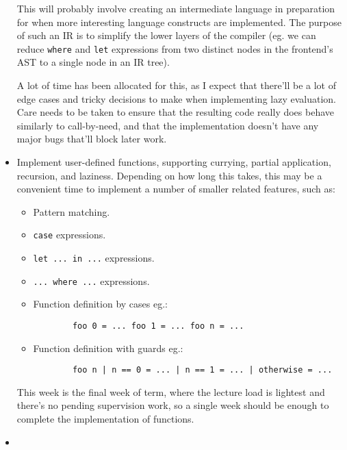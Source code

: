 \documentclass[12pt]{article}
\newcommand\haskell[1]{\texttt{#1}}
\begin{document}
\begin{itemize}
{    This will probably involve creating an intermediate language in preparation for when more interesting language
    constructs are implemented. The purpose of such an IR is to simplify the lower layers of the compiler (eg. we can
    reduce \haskell{where} and \haskell{let} expressions from two distinct nodes in the frontend's AST to a single node
    in an IR tree).

    A lot of time has been allocated for this, as I expect that there'll be a lot of edge cases and tricky decisions to
    make when implementing lazy evaluation. Care needs to be taken to ensure that the resulting code really does behave
    similarly to call-by-need, and that the implementation doesn't have any major bugs that'll block later work.
}
\item
{

    Implement user-defined functions, supporting currying, partial application, recursion, and laziness. Depending on
    how long this takes, this may be a convenient time to implement a number of smaller related features, such as:
    
    \begin{itemize}
    \item Pattern matching.
    \item \haskell{case} expressions.
    \item \haskell{let ... in ...} expressions.
    \item \haskell{... where ...} expressions.
    \item
    {

        Function definition by cases eg.:
        \begin{verbatim}
        foo 0 = ... foo 1 = ... foo n = ...
        \end{verbatim}
    }
    \item
    {

        Function definition with guards eg.:
        \begin{verbatim}
        foo n | n == 0 = ... | n == 1 = ... | otherwise = ...
        \end{verbatim}
    }
    \end{itemize}

    This week is the final week of term, where the lecture load is lightest and there's no pending supervision work, so
    a single week should be enough to complete the implementation of functions.
}
\item
{

}
\end{itemize}
\end{document}
